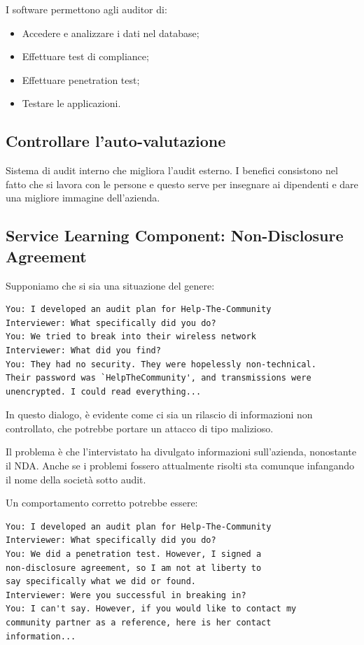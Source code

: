 I software permettono agli auditor di:
\begin{itemize}
\item Accedere e analizzare i dati nel database;
\item Effettuare test di compliance;
\item Effettuare penetration test;
\item Testare le applicazioni.
\end{itemize}


\subsection{Controllare l'auto-valutazione}

Sistema di audit interno che migliora l'audit esterno. I benefici consistono
nel fatto che si lavora con le persone e questo serve per insegnare ai
dipendenti e dare una migliore immagine dell'azienda.


\subsection{Service Learning Component: Non-Disclosure Agreement}

Supponiamo che si sia una situazione del genere:

\begin{verbatim}
You: I developed an audit plan for Help-The-Community
Interviewer: What specifically did you do?
You: We tried to break into their wireless network
Interviewer: What did you find?
You: They had no security. They were hopelessly non-technical.
Their password was `HelpTheCommunity', and transmissions were
unencrypted. I could read everything...
\end{verbatim}

In questo dialogo, è evidente come ci sia un rilascio di informazioni non
controllato, che potrebbe portare un attacco di tipo malizioso.

Il problema è che l'intervistato ha divulgato informazioni sull'azienda,
nonostante il NDA. Anche se i problemi fossero attualmente risolti sta comunque
infangando il nome della società sotto audit.


Un comportamento corretto potrebbe essere:
\begin{verbatim}
You: I developed an audit plan for Help-The-Community
Interviewer: What specifically did you do?
You: We did a penetration test. However, I signed a
non-disclosure agreement, so I am not at liberty to
say specifically what we did or found.
Interviewer: Were you successful in breaking in?
You: I can't say. However, if you would like to contact my
community partner as a reference, here is her contact
information...
\end{verbatim}

